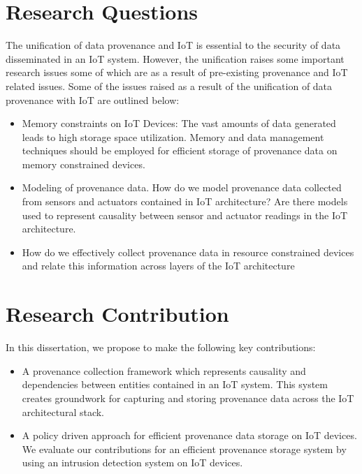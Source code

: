 \section{Research Questions}
The unification of data provenance and IoT is essential to the security of data disseminated in an IoT system. However, the unification raises some important research issues some of which are as a result of pre-existing provenance and IoT related issues. Some of the issues raised as a result of the unification of data provenance with IoT are outlined below:

\begin{itemize}

\item Memory constraints on IoT Devices: The vast amounts of data generated leads to high storage space utilization. Memory and data management techniques should be employed for efficient storage of provenance data on memory constrained devices. 

\item Modeling of provenance data. How do we model provenance data collected from sensors and actuators contained in IoT architecture? Are there models used to represent causality between sensor and actuator readings in the IoT architecture.

\item How do we effectively collect provenance data in resource constrained devices and relate this information across layers of the IoT architecture

\end{itemize}

\section{Research Contribution}

In this dissertation, we propose to make the following key contributions:

\begin{itemize}
  \item A provenance collection framework which represents causality and dependencies between entities contained in an IoT system. This system creates groundwork for capturing and storing provenance data  across the IoT architectural stack.
  \item A policy driven approach for efficient provenance data storage on IoT devices. We evaluate our contributions for an efficient provenance storage system by using an intrusion detection system on IoT devices.
\end{itemize}

